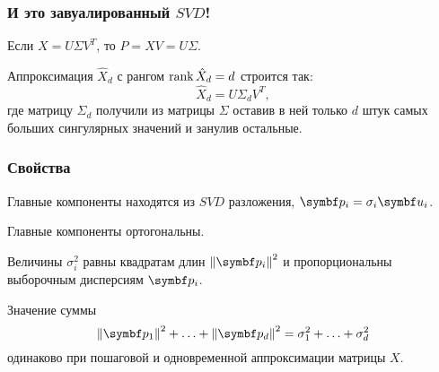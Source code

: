 \begin{frame}
  \frametitle{И это завуалированный $SVD$!}

  Если $X = U\Sigma V^T$, то $P = XV = U\Sigma$. \pause


  Аппроксимация $\hat X_d$ с рангом $\rank \hat X_d = d$ строится так:
  \[
  \hat X_d = U \Sigma_d V^T,  
  \]
  где матрицу $\Sigma_d$ получили из матрицы $\Sigma$ оставив в ней только $d$ штук
  самых больших сингулярных значений и занулив остальные.


\end{frame}



\begin{frame}
  \frametitle{Свойства}

  Главные компоненты находятся из $SVD$ разложения, $\bp_i = \sigma_i \bu_i$. 

  Главные компоненты ортогональны. 

  Величины $\sigma^2_i$ равны квадратам длин $\norm{\bp_i}^2$ 
  и пропорциональны выборочным дисперсиям $\bp_i$.  \pause

  Значение суммы 
  \[
    \norm{\bp_1}^2 + \ldots + \norm{\bp_d}^2 = \sigma^2_1 + \ldots + \sigma^2_d
  \]
  одинаково при пошаговой и одновременной аппроксимации матрицы $X$.


\end{frame}

